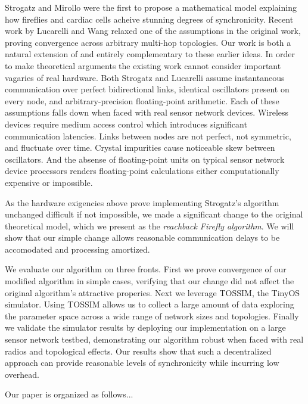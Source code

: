 Strogatz and Mirollo were the first to propose a mathematical model
explaining how fireflies and cardiac cells acheive stunning degrees of
synchronicity.  Recent work by Lucarelli and Wang relaxed one of the
assumptions in the original work, proving convergence across arbitrary
multi-hop topologies.  Our work is both a natural extension of and entirely
complementary to these earlier ideas.  In order to make theoretical arguments
the existing work cannot consider important vagaries of real hardware.  Both
Strogatz and Lucarelli assume instantaneous communication over perfect
bidirectional links, identical oscillators present on every node, and
arbitrary-precision floating-point arithmetic.  Each of these assumptions
falls down when faced with real sensor network devices.  Wireless devices
require medium access control which introduces significant communication
latencies.  Links between nodes are not perfect, not symmetric, and fluctuate
over time.  Crystal impurities cause noticeable skew between oscillators.
And the absense of floating-point units on typical sensor network device
processors renders floating-point calculations either computationally
expensive or impossible.

As the hardware exigencies above prove implementing Strogatz's algorithm
unchanged difficult if not impossible, we made a significant change to the
original theoretical model, which we present as the {\em reachback Firefly
algorithm}.  We will show that our simple change allows reasonable
communication delays to be accomodated and processing amortized.

We evaluate our algorithm on three fronts.  First we prove convergence of our
modified algorithm in simple cases, verifying that our change did not affect
the original algorithm's attractive properies.  Next we leverage TOSSIM, the
TinyOS simulator.  Using TOSSIM allows us to collect a large amount of data
exploring the parameter space across a wide range of network sizes and
topologies.  Finally we validate the simulator results by deploying our
implementation on a large sensor network testbed, demonstrating our algorithm
robust when faced with real radios and topological effects.  Our results show
that such a decentralized approach can provide reasonable levels of
synchronicity while incurring low overhead.

Our paper is organized as follows...

